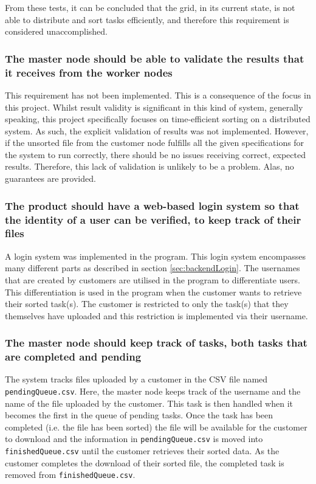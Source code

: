 From these tests, it can be concluded that the grid, in its current state, is not able to distribute and sort tasks efficiently, and therefore this requirement is considered unaccomplished. 


\subsubsection{The master node should be able to validate the results that it receives from the worker nodes}

This requirement has not been implemented. This is a consequence of the focus in this project. Whilst result validity is significant in this kind of system, generally speaking, this project specifically focuses on time-efficient sorting on a distributed system. As such, the explicit validation of results was not implemented. However, if the unsorted file from the customer node fulfills all the given specifications for the system to run correctly, there should be no issues receiving correct, expected results. Therefore, this lack of validation is unlikely to be a problem. Alas, no guarantees are provided. 

\subsubsection{The product should have a web-based login system so that the identity of a user can be verified, to keep track of their files}
A login system was implemented in the program. This login system encompasses many different parts as described in section \ref{sec:backendLogin}. The usernames that are created by customers are utilised in the program to differentiate users. This differentiation is used in the program when the customer wants to retrieve their sorted task(s). The customer is restricted to only the task(s) that they themselves have uploaded and this restriction is implemented via their username.


\subsubsection{The master node should keep track of tasks, both tasks that are completed and pending}

The system tracks files uploaded by a customer in the CSV file named \lstinline{pendingQueue.csv}. Here, the master node keeps track of the username and the name of the file uploaded by the customer. This task is then handled when it becomes the first in the queue of pending tasks. Once the task has been completed (i.e. the file has been sorted) the file will be available for the customer to download and the information in \lstinline{pendingQueue.csv} is moved into \lstinline{finishedQueue.csv} until the customer retrieves their sorted data. As the customer completes the download of their sorted file, the completed task is removed from \lstinline{finishedQueue.csv}. 

